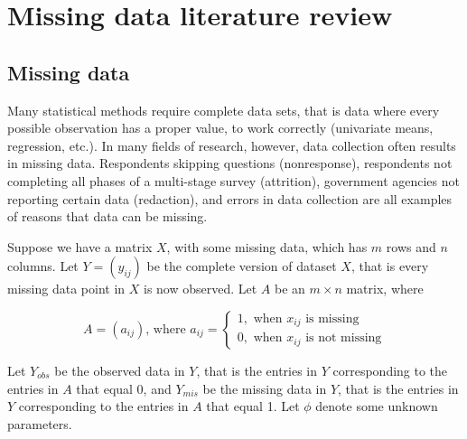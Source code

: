 \documentclass[12pt,twoside]{reedthesis}
\begin{document}
\hypertarget{missing-litreview}{%
\chapter{Missing data literature review}\label{missing-litreview}}

\hypertarget{missing-data}{%
\section{Missing data}\label{missing-data}}

Many statistical methods require complete data sets, that is data where every possible observation has a proper value, to work correctly (univariate means, regression, etc.). In many fields of research, however, data collection often results in missing data. Respondents skipping questions (nonresponse), respondents not completing all phases of a multi-stage survey (attrition), government agencies not reporting certain data (redaction), and errors in data collection are all examples of reasons that data can be missing.

Suppose we have a matrix \(X\), with some missing data, which has \(m\) rows and \(n\) columns. Let \(Y = (y_{ij})\) be the complete version of dataset \(X\), that is every missing data point in \(X\) is now observed. Let \(A\) be an \(m \times n\) matrix, where

\[
A = (a_{ij}) \text{, where } a_{ij} =
\begin{cases}
1, \text{ when }x_{ij}\text{ is missing}\\
0, \text{ when }x_{ij}\text{ is not missing}
\end{cases}
\]

Let \(Y_{obs}\) be the observed data in \(Y\), that is the entries in \(Y\) corresponding to the entries in \(A\) that equal 0, and \(Y_{mis}\) be the missing data in \(Y\), that is the entries in \(Y\) corresponding to the entries in \(A\) that equal 1. Let \(\phi\) denote some unknown parameters.
\end{document}
